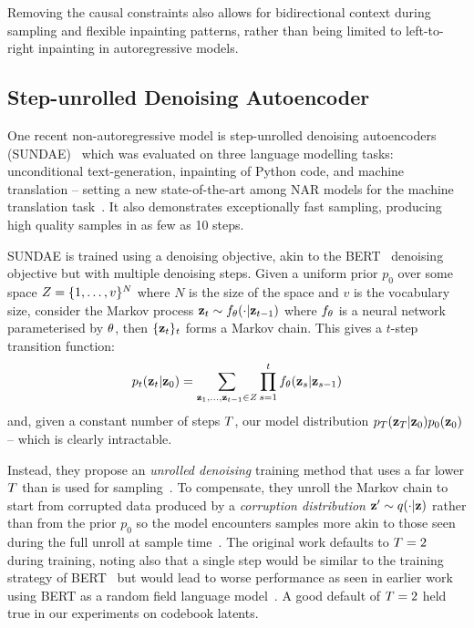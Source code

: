 Removing the causal constraints also allows for bidirectional context during
sampling and flexible inpainting patterns, rather than being limited to
left-to-right inpainting in autoregressive models.

\subsection{Step-unrolled Denoising Autoencoder}
\label{subsec:sundae}
One recent non-autoregressive model is step-unrolled denoising autoencoders
(SUNDAE)~\cite{savinov2022stepunrolled} which was evaluated on three language
modelling tasks: unconditional text-generation, inpainting of Python code, and
machine translation -- setting a new state-of-the-art among NAR models for the
machine translation task~\cite{savinov2022stepunrolled}. It also demonstrates
exceptionally fast sampling, producing high quality samples in as few as 10
steps.

SUNDAE is trained using a denoising objective, akin to the
BERT~\cite{wang2019bert} denoising objective but with multiple denoising steps.
Given a uniform prior $p_0$ over some space $Z = \{1, \dots,
v\}^N$ where $N$ is the size of the space and $v$ is the
vocabulary size, consider the Markov process $\mathbf{z}_t \sim f_\theta(\cdot \vert
\mathbf{z}_{t-1})$ where $f_\theta$ is a neural network parameterised by
$\theta$, then $\{\mathbf{z}_t\}_t$ forms a Markov chain. This gives a
$t$-step transition function: \begin{equation}\label{eq:markov} p_t(\mathbf{z}_t
    \vert \mathbf{z}_0) = \sum\limits_{\mathbf{z}_1, \dots, \mathbf{z}_{t-1} \in
    Z} \prod\limits^t_{s=1} f_\theta(\mathbf{z}_s | \mathbf{z}_{s-1})
\end{equation}\cite{savinov2022stepunrolled} and, given a constant number of
steps $T$, our model distribution
$p_T(\mathbf{z}_T \vert \mathbf{z}_0)p_0(\mathbf{z}_0)$ -- which is
clearly intractable.

Instead, they propose an \textit{unrolled denoising} training method that uses a
far lower $T$ than is used for
sampling~\cite{savinov2022stepunrolled}. To compensate, they unroll the Markov
chain to start from corrupted data produced by a \textit{corruption
distribution} $\mathbf{z}' \sim q(\cdot \vert \mathbf{z})$ rather than from the prior $p_0$ so the model
encounters samples more akin to those seen during the full unroll at sample
time~\cite{savinov2022stepunrolled}. The original work defaults to $T
= 2$ during training, noting also that a single step would be similar to the
training strategy of BERT~\cite{devlin2019bert} but would lead to worse
performance as seen in earlier work using BERT as a random field language
model~\cite{wang2019bert}. A good default of $T = 2$ held true in our
experiments on codebook latents.

